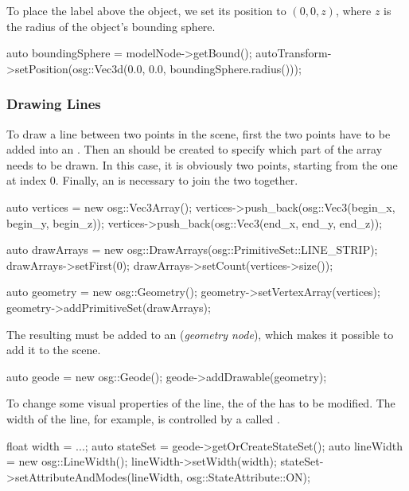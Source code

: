 To place the label above the object, we set its position to $(0,0,z)$, where $z$
is the radius of the object's bounding sphere.

\begin{cpp}
auto boundingSphere = modelNode->getBound();
autoTransform->setPosition(osg::Vec3d(0.0, 0.0, boundingSphere.radius()));
\end{cpp}



\subsubsection{Drawing Lines}
\label{sec:graphics:osg-drawing-lines}

To draw a line between two points in the scene, first the two points
have to be added into an . Then an 
should be created to specify which part of the array needs to be drawn.
In this case, it is obviously two points, starting from the one at index 0.
Finally, an  is necessary to join the two together.

\begin{cpp}
auto vertices = new osg::Vec3Array();
vertices->push_back(osg::Vec3(begin_x, begin_y, begin_z));
vertices->push_back(osg::Vec3(end_x, end_y, end_z));

auto drawArrays = new osg::DrawArrays(osg::PrimitiveSet::LINE_STRIP);
drawArrays->setFirst(0);
drawArrays->setCount(vertices->size());

auto geometry = new osg::Geometry();
geometry->setVertexArray(vertices);
geometry->addPrimitiveSet(drawArrays);
\end{cpp}

The resulting  must be added to an 
(\textit{geometry node}), which makes it possible to add it to the scene.

\begin{cpp}
auto geode = new osg::Geode();
geode->addDrawable(geometry);
\end{cpp}

To change some visual properties of the line, the  of the
 has to be modified. The width of the line, for example, is
controlled by a  called .

\begin{cpp}
float width = ...;
auto stateSet = geode->getOrCreateStateSet();
auto lineWidth = new osg::LineWidth();
lineWidth->setWidth(width);
stateSet->setAttributeAndModes(lineWidth, osg::StateAttribute::ON);
\end{cpp}

